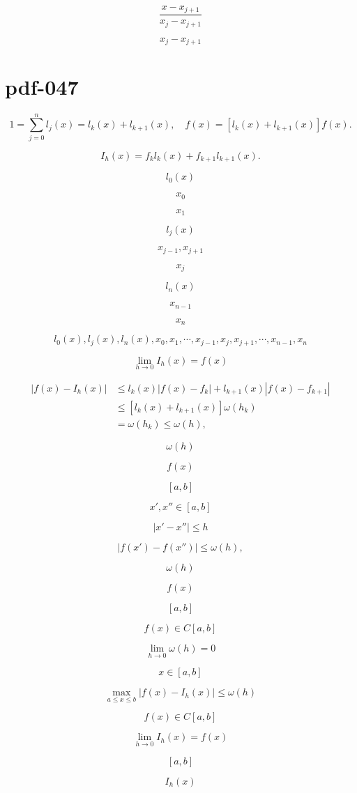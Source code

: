\documentclass[fontset=fandol]{ctexart}
\begin{document}
\[\frac{x-x_{j+1}}{x_j-x_{j+1}}\]

\[x_j-x_{j+1}\]

\section*{pdf-047}

\[1=\sum_{j=0}^nl_j(x)=l_k(x)+l_{k+1}(x),\quad f(x)=[l_k(x)+l_{k+1}(x)]f(x).\]

\[I_h(x)=f_kl_k(x)+f_{k+1}l_{k+1}(x).\]

\[l_0(x)\]

\[x_0\]

\[x_1\]

\[l_j(x)\]

\[x_{j-1},x_{j+1}\]

\[x_j\]

\[l_n(x)\]

\[x_{n-1}\]

\[x_n\]

\[l_0(x),l_j(x),l_n(x),x_0,x_1,\cdots,x_{j-1},x_j,x_{j+1},\cdots,x_{n-1},x_n\]

\[\lim_{h\to0}I_h(x)=f(x)\]

\[\begin{aligned}
|f(x)-I_h(x)|&\leqslant l_k(x)|f(x)-f_k|+l_{k+1}(x)|f(x)-f_{k+1}|\\
&\leqslant[l_k(x)+l_{k+1}(x)]\omega(h_k)\\
&=\omega(h_k)\leqslant\omega(h),
\end{aligned}\tag{2.7.4}\]

\[\omega(h)\]

\[f(x)\]

\[[a,b]\]

\[x',x''\in[a,b]\]

\[|x'-x''|\leqslant h\]

\[|f(x')-f(x'')|\leqslant\omega(h),\]

\[\omega(h)\]

\[f(x)\]

\[[a,b]\]

\[f(x)\in C[a,b]\]

\[\lim_{h\to0}\omega(h)=0\]

\[x\in[a,b]\]

\[\max_{a\leqslant x\leqslant b}|f(x)-I_h(x)|\leqslant\omega(h)\]

\[f(x)\in C[a,b]\]

\[\lim_{h\to0}I_h(x)=f(x)\]

\[[a,b]\]

\[I_h(x)\]
\end{document}
